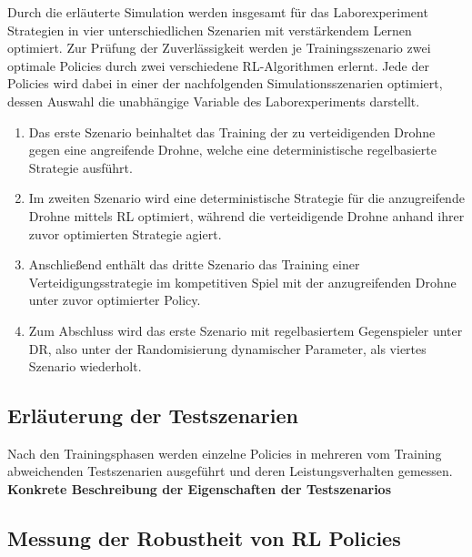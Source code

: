 Durch die erläuterte Simulation werden insgesamt für das Laborexperiment Strategien in vier unterschiedlichen Szenarien mit verstärkendem Lernen optimiert.
Zur Prüfung der Zuverlässigkeit werden je Trainingsszenario zwei optimale Policies durch zwei verschiedene RL-Algorithmen erlernt.
Jede der Policies wird dabei in einer der nachfolgenden Simulationsszenarien optimiert, dessen Auswahl die unabhängige Variable des Laborexperiments darstellt.
\begin{enumerate}
    \item Das erste Szenario beinhaltet das Training der zu verteidigenden Drohne gegen eine angreifende Drohne, welche eine deterministische regelbasierte Strategie ausführt.
    \item Im zweiten Szenario wird eine deterministische Strategie für die anzugreifende Drohne mittels RL optimiert, während die verteidigende Drohne anhand ihrer zuvor optimierten Strategie agiert.
    \item Anschließend enthält das dritte Szenario das Training einer Verteidigungsstrategie im kompetitiven Spiel mit der anzugreifenden Drohne unter zuvor optimierter Policy.
    \item Zum Abschluss wird das erste Szenario mit regelbasiertem Gegenspieler unter DR, also unter der Randomisierung dynamischer Parameter, als viertes Szenario wiederholt. 
\end{enumerate}

\subsection{Erläuterung der Testszenarien}

Nach den Trainingsphasen werden einzelne Policies in mehreren vom Training abweichenden Testszenarien ausgeführt und deren Leistungsverhalten gemessen.
\textbf{Konkrete Beschreibung der Eigenschaften der Testszenarios}

\subsection{Messung der Robustheit von RL Policies}

